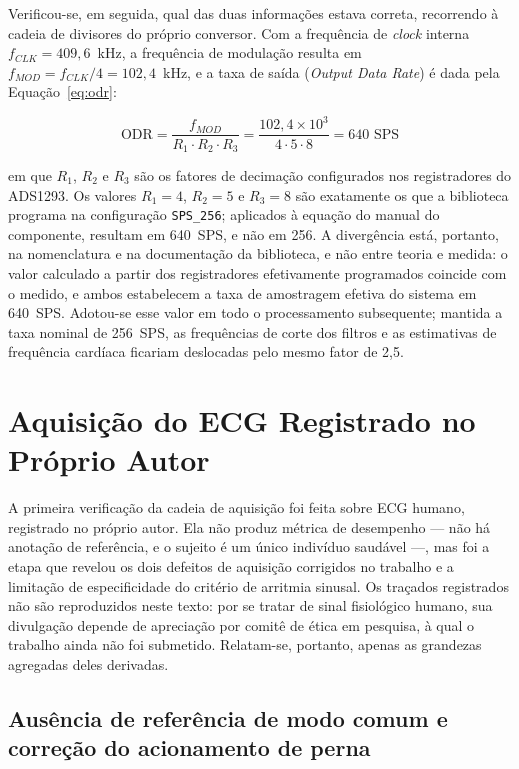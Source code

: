 Verificou-se, em seguida, qual das duas informações estava correta, recorrendo à cadeia de divisores do próprio conversor. Com a frequência de \textit{clock} interna $f_{CLK} = 409{,}6$~kHz, a frequência de modulação resulta em $f_{MOD} = f_{CLK}/4 = 102{,}4$~kHz, e a taxa de saída (\textit{Output Data Rate}) é dada pela Equação~\ref{eq:odr}:

\begin{equation}
    \text{ODR} = \frac{f_{MOD}}{R_1 \cdot R_2 \cdot R_3} = \frac{102{,}4 \times 10^3}{4 \cdot 5 \cdot 8} = 640 \text{ SPS}
    \label{eq:odr}
\end{equation}

\noindent em que $R_1$, $R_2$ e $R_3$ são os fatores de decimação configurados nos registradores do ADS1293. Os valores $R_1 = 4$, $R_2 = 5$ e $R_3 = 8$ são exatamente os que a biblioteca programa na configuração \texttt{SPS\_256}; aplicados à equação do manual do componente, resultam em 640~SPS, e não em 256. A divergência está, portanto, na nomenclatura e na documentação da biblioteca, e não entre teoria e medida: o valor calculado a partir dos registradores efetivamente programados coincide com o medido, e ambos estabelecem a taxa de amostragem efetiva do sistema em 640~SPS. Adotou-se esse valor em todo o processamento subsequente; mantida a taxa nominal de 256~SPS, as frequências de corte dos filtros e as estimativas de frequência cardíaca ficariam deslocadas pelo mesmo fator de 2,5.

\section{Aquisição do ECG Registrado no Próprio Autor}
\label{sec:resEcgProprio}

A primeira verificação da cadeia de aquisição foi feita sobre \acs{ECG} humano, registrado
no próprio autor. Ela não produz métrica de desempenho --- não há anotação de referência, e
o sujeito é um único indivíduo saudável ---, mas foi a etapa que revelou os dois defeitos
de aquisição corrigidos no trabalho e a limitação de especificidade do critério de arritmia
sinusal. Os traçados registrados não são reproduzidos neste texto: por se tratar de sinal
fisiológico humano, sua divulgação depende de apreciação por comitê de ética em pesquisa, à
qual o trabalho ainda não foi submetido. Relatam-se, portanto, apenas as grandezas
agregadas deles derivadas.

\subsection{Ausência de referência de modo comum e correção do acionamento de perna}
\label{sec:resSinal}

